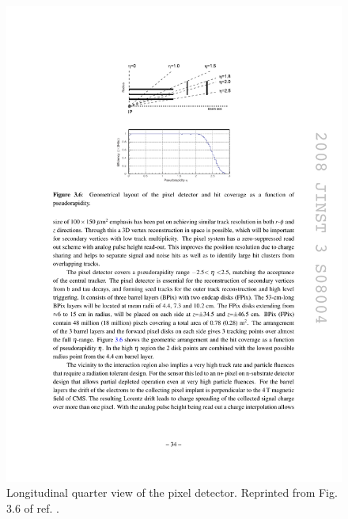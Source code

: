 \documentclass[dissertation.tex]{subfiles}
\begin{document}
\begin{figure}
	\centering
	\includegraphics[scale=1.0]{pixel_longitudinal_quarter_view}
	\caption{Longitudinal quarter view of the pixel detector.  Reprinted from Fig. 3.6 of ref. \cite{CMS_detector_paper}.}
	\label{fig:pixel_longitudinal_quarter_view}
\end{figure}
\end{document}
